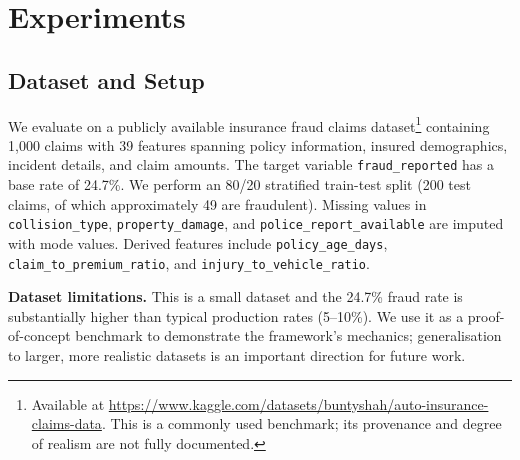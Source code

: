 \raggedbottom
\section{Experiments}
\label{sec:experiments}

\subsection{Dataset and Setup}
\label{sec:exp_setup}

We evaluate on a publicly available insurance fraud claims dataset\footnote{Available at \url{https://www.kaggle.com/datasets/buntyshah/auto-insurance-claims-data}. This is a commonly used benchmark; its provenance and degree of realism are not fully documented.} containing 1{,}000 claims with 39 features spanning policy information, insured demographics, incident details, and claim amounts. The target variable \texttt{fraud\_reported} has a base rate of 24.7\%. We perform an 80/20 stratified train-test split (200 test claims, of which approximately 49 are fraudulent). Missing values in \texttt{collision\_type}, \texttt{property\_damage}, and \texttt{police\_report\_available} are imputed with mode values. Derived features include \texttt{policy\_age\_days}, \texttt{claim\_to\_premium\_ratio}, and \texttt{injury\_to\_vehicle\_ratio}.

\noindent\textbf{Dataset limitations.} This is a small dataset and the 24.7\% fraud rate is substantially higher than typical production rates (5--10\%). We use it as a proof-of-concept benchmark to demonstrate the framework's mechanics; generalisation to larger, more realistic datasets is an important direction for future work.

